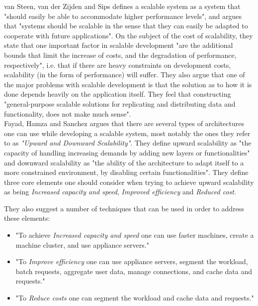 \documentclass{article}
\begin{document}
{van Steen, van der Zijden and Sips\cite{van1998software} defines a scalable
system as a system that "should easily be able to accommodate higher
performance levels", and argues that "systems should be scalable in the sense
that they can easily be adapted to cooperate with future applications".  On the
subject of the cost of scalability, they state that one important factor in
scalable development "are the additional bounds that limit the increase of
costs, and the degradation of performance, respectively", i.e. that if there
are heavy constraints on development costs, scalability (in the form of
performance) will suffer.  They also argue that one of the major problems with
scalable development is that the solution as to how it is done depends heavily
on the application itself.  They feel that constructing "general-purpose
scalable solutions for replicating and distributing data and functionality,
does not make much sense".
\\

Fayad, Hamza and Sanchez \cite{fayad2005towards} argues that there are several
types of architectures one can use while developing a scalable system, most
notably the ones they refer to as \emph{"Upward and Downward Scalability"}.
They define upward scalability as "the capacity of handling increasing demands
by adding new layers or functionalities" and downward scalability as "the
ability of the architecture to adapt itself to a more constrained environment,
by disabling certain functionalities".
They define three core elements one should consider when trying to achieve
upward scalability as being \emph{Increased capacity and speed}, \emph{Improved
efficiency} and \emph{Reduced cost}. 

They also suggest a number of techniques that can be used in order to address
these elements: 
\begin{itemize}
\item{"To achieve \emph{Increased capacity and speed} one can use faster
machines, create a machine cluster, and use appliance servers."} 
\item{"To \emph{Improve efficiency} one can use appliance servers, segment the
workload, batch requests, aggregate user data, manage connections, and cache
data and requests."}  
\item{"To \emph{Reduce costs} one can segment the workload and cache data and
requests."}
\end{itemize}

}
\end{document}
